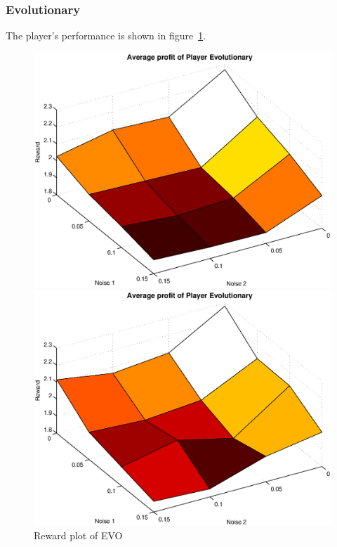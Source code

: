 \subsubsection{Evolutionary}
The player's performance is shown in figure~\ref{pic player evo}.\\
\begin{figure}[h]
	\caption{Reward plot of EVO}
	\label{pic player evo}
\begin{minipage}[hbt]{0.65\textwidth}
	\centering
	\includegraphics[width=\textwidth]{pics/simulation1/Reward_vs_Noise_of_Player_Evolutionary}
\end{minipage}
\hfill
\begin{minipage}[hbt]{0.3\textwidth}
	\centering
	\includegraphics[width=\textwidth]{pics/simulation2/Reward_vs_Noise_of_Player_Evolutionary}
\end{minipage}

\end{figure}

